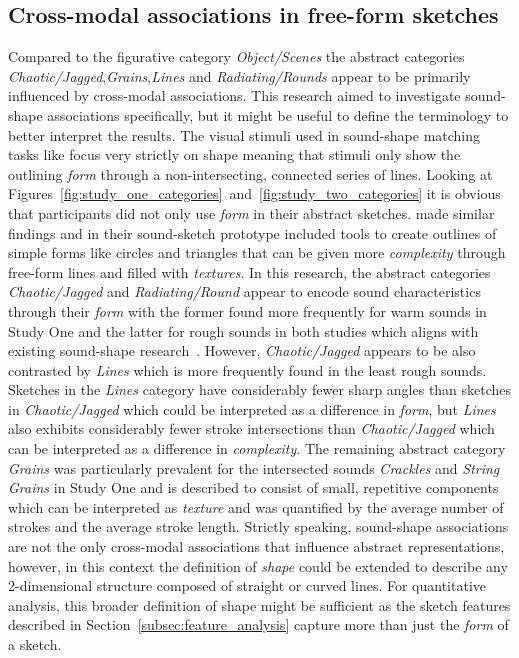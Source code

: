 \documentclass[]{interact}
\theoremstyle{plain}%
\theoremstyle{definition}
\theoremstyle{remark}
\begin{document}
\subsection{Cross-modal associations in free-form sketches}
Compared to the figurative category \textit{Object/Scenes} the abstract categories \textit{Chaotic/Jagged},\textit{Grains},\textit{Lines} and \textit{Radiating/Rounds} appear to be primarily influenced by cross-modal associations. This research aimed to investigate sound-shape associations specifically, but it might be useful to define the terminology to better interpret the results. The visual stimuli used in sound-shape matching tasks like  focus very strictly on shape meaning that stimuli only show the outlining \textit{form} through a non-intersecting, connected series of lines. Looking at Figures~\ref{fig:study_one_categories}~and~\ref{fig:study_two_categories} it is obvious that participants did not only use \textit{form} in their abstract sketches.  made similar findings and in their sound-sketch prototype included tools to create outlines of simple forms like circles and triangles that can be given more \textit{complexity} through free-form lines and filled with \textit{textures}. In this research, the abstract categories \textit{Chaotic/Jagged} and \textit{Radiating/Round} appear to encode sound characteristics through their \textit{form} with the former found more frequently for warm sounds in Study One and the latter for rough sounds in both studies which aligns with existing sound-shape research~\cite{kohler1929gestalt,adeliAudiovisualCorrespondenceMusical2014}. However, \textit{Chaotic/Jagged} appears to be also contrasted by \textit{Lines} which is more frequently found in the least rough sounds. Sketches in the \textit{Lines} category have considerably fewer sharp angles than sketches in \textit{Chaotic/Jagged} which could be interpreted as a difference in \textit{form}, but \textit{Lines} also exhibits considerably fewer stroke intersections than \textit{Chaotic/Jagged} which can be interpreted as a difference in \textit{complexity}. The remaining abstract category \textit{Grains} was particularly prevalent for the intersected sounds \textit{Crackles} and \textit{String Grains} in Study One and is described to consist of small, repetitive components which can be interpreted as \textit{texture} and was quantified by the average number of strokes and the average stroke length. Strictly speaking, sound-shape associations are not the only cross-modal associations that influence abstract representations, however, in this context the definition of \textit{shape} could be extended to describe any 2-dimensional structure composed of straight or curved lines. For quantitative analysis, this broader definition of shape might be sufficient as the sketch features described in Section~\ref{subsec:feature_analysis} capture more than just the \textit{form} of a sketch. 
\end{document}
